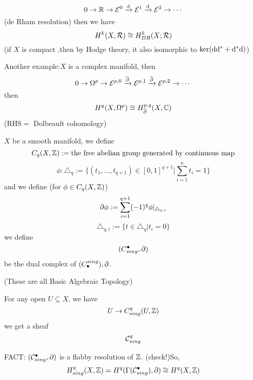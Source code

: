 
$$0\to\mathbb{R}\to\mathcal{E}^0\xrightarrow{\mathrm{d}}\mathcal{E}^1\xrightarrow{\mathrm{d}}\mathcal{E}^2\to\cdots$$
(de Rham resolution) then we have
$$H^k(X,\mathcal{R})\cong H_{DR}^k(X;\mathcal{R})$$
(if $X$ is compact ,then by Hodge theory, it also isomorphic to $\ker(\mathrm{d}\mathrm{d}^*+\mathrm{d}^*\mathrm{d})$)

Another example:$X$ is a complex manifold, then
$$0\to\Omega^p\to\mathcal{E}^{p,0}\xrightarrow{\overline{\partial}}\mathcal{E}^{p,1}\xrightarrow{\overline{\partial}}\mathcal{E}^{p,2}\to\cdots$$
then
$$H^{q}(X,\Omega^p)\cong H_{\overline{\partial}}^{p,q}(X,\mathbb{C})$$
(RHS$=$ Dolbeault cohomology)


$X$ be a smooth manifold, we define
$$C_q(X,\mathbb{Z}):=\text{the free abelian group generated by continuous map}$$
$$\phi:\triangle_q:=\{(t_1,...,t_{q+1})\in[0,1]^{q+1}|\sum_{i=1}^nt_i=1\}$$
and we define (for $\phi\in C_q(X,\mathbb{Z})$)
$$\partial\phi:=\sum_{i=1}^{q+1}(-1)^q\phi|_{\triangle_{q,i}}$$
$$\triangle_{q,i}:=\{t\in\triangle_q|t_i=0\}$$
we define
$$(C_{sing}^{\bullet},\partial)$$
be the dual complex of $(C^{sing}_{\bullet}),\partial$.

(These are all Basic Algebraic Topology)

For any open $U\subseteq X$, we have
$$U\to C_{sing}^q(U,\mathbb{Z})$$
we get a sheaf
$$\mathcal{C}_{sing}^q$$

FACT: $(\mathcal{C}_{sing}^{\bullet},\partial)$ is a flabby resolution of $\mathbb{Z}$. (check!)So,
$$H^q_{sing}(X,\mathbb{Z})= H^q(\Gamma(\mathcal{C}_{sing}^{\bullet}),\partial)
\cong H^q(X,\mathbb{Z})$$



